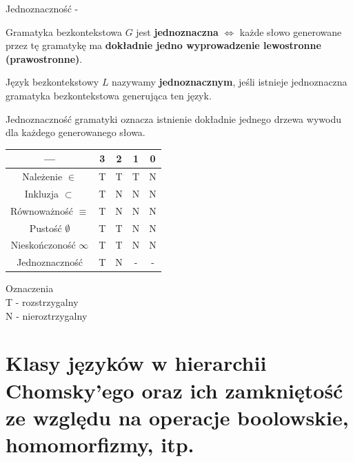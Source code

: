 \documentclass[12pt]{article}
\begin{document}
    \begin{definition}
        Jednoznaczność -

        Gramatyka bezkontekstowa $G$ jest \textbf{jednoznaczna} $\Leftrightarrow$ każde słowo generowane przez tę gramatykę ma \textbf{dokładnie jedno wyprowadzenie lewostronne (prawostronne)}.

        Język bezkontekstowy $L$ nazywamy \textbf{jednoznacznym}, jeśli istnieje jednoznaczna gramatyka bezkontekstowa generująca ten język.

        Jednoznaczność gramatyki oznacza istnienie dokładnie jednego drzewa wywodu dla każdego generowanego słowa.
    \end{definition}


    \begin{center}
        \begin{tabular}{||c c c c c||}
            \hline
            --- & 3 & 2 & 1 & 0 \\ [0.5ex]
            \hline\hline
            Należenie $\in$ & T & T & T & N \\
            \hline
            Inkluzja $\subset$ & T & N & N & N \\
            \hline
            Równoważność $\equiv$ & T & N & N & N \\
            \hline
            Pustość $\emptyset$ & T & T & N & N \\
            \hline
            Nieskończoność $\infty$ & T & T & N & N \\
            \hline
            Jednoznaczność & T & N & - & - \\ [1ex]
            \hline
        \end{tabular}
    \end{center}

    Oznaczenia\\
    T - rozstrzygalny\\
    N - nieroztrzygalny

    \newpage


    \section{Klasy języków w hierarchii Chomsky’ego oraz ich zamkniętość ze względu na operacje boolowskie, homomorfizmy, itp.}
\end{document}
